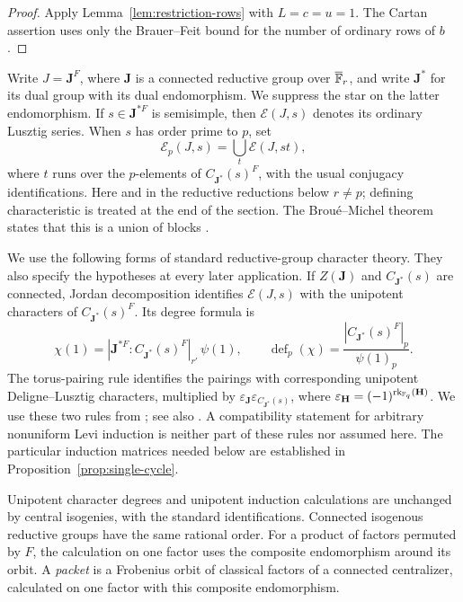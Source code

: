 \begin{proof}
Apply Lemma~\ref{lem:restriction-rows} with \(L=c=u=1\).
The Cartan assertion uses only the Brauer--Feit bound for the
number of ordinary rows of \(b\).
\end{proof}

Write \(J=\mathbf J^F\), where \(\mathbf J\) is a connected reductive
group over \(\overline{\mathbb F}_r\), and write \(\mathbf J^*\) for its dual
group with its dual endomorphism.  We suppress the star on the latter
endomorphism.  If \(s\in\mathbf J^{*F}\) is semisimple, then
\(\mathcal E(J,s)\) denotes its ordinary Lusztig series.  When \(s\)
has order prime to \(p\), set
\[
 \mathcal E_p(J,s)
  =\bigcup_t\mathcal E(J,st),
\]
where \(t\) runs over the \(p\)-elements of
\(C_{\mathbf J^*}(s)^F\), with the usual conjugacy identifications.
Here and in the reductive reductions below \(r\ne p\); defining
characteristic is treated at the end of the section.  The
Brou\'e--Michel theorem states that this is a union of blocks
\cite{BroueMichel1989,CEBook}.

We use the following forms of standard reductive-group character
theory.  They also specify the hypotheses at every later application.
If \(Z(\mathbf J)\) and \(C_{\mathbf J^*}(s)\) are connected, Jordan
decomposition identifies \(\mathcal E(J,s)\) with the unipotent
characters of \(C_{\mathbf J^*}(s)^F\).  Its degree formula is
\begin{equation}\label{fam:jordan-degree}
 \chi(1)=
  |\mathbf J^{*F}:C_{\mathbf J^*}(s)^F|_{r'}\,\psi(1),
 \qquad
 \operatorname{def}_p(\chi)
  =\frac{|C_{\mathbf J^*}(s)^F|_p}{\psi(1)_p}.
\end{equation}
The torus-pairing rule identifies the pairings with corresponding
unipotent Deligne--Lusztig characters, multiplied by
\(\varepsilon_{\mathbf J}\varepsilon_{C_{\mathbf J^*}(s)}\), where
\(\varepsilon_{\mathbf H}=(-1)^{\operatorname{rk}_{\mathbb F_q}(\mathbf H)}\).
We use these two rules from \cite{LusztigCharacters}; see also
\cite[Equation~(3.1) and Theorem~7.1]{DigneMichel1990}.
A compatibility
statement for arbitrary nonuniform Levi induction is neither part of
these rules nor assumed here.  The particular induction matrices needed
below are established in Proposition~\ref{prop:single-cycle}.

Unipotent character degrees and unipotent induction calculations are
unchanged by central isogenies, with the standard identifications.
Connected isogenous reductive groups have the same rational order.
For a product of factors permuted by \(F\), the calculation on one
factor uses the composite endomorphism around its orbit.
A \emph{packet} is a Frobenius orbit of classical factors of a
connected centralizer, calculated on one factor with this composite
endomorphism.

